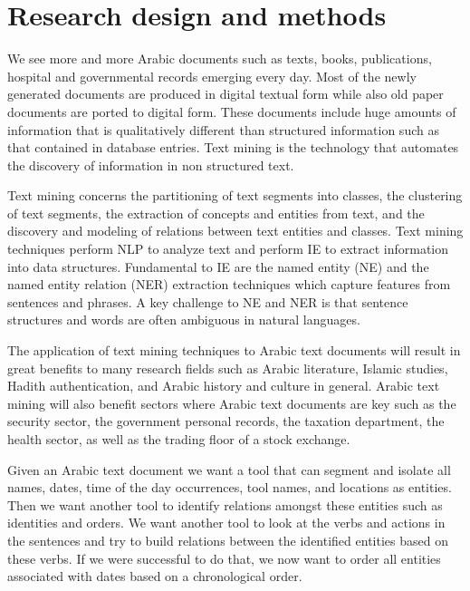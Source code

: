 \documentclass[12pt]{article}
\begin{document}
\section{Research design and methods}
\label{s:designmethods}

We see more and more Arabic documents such as texts,
books, publications, hospital and governmental records emerging 
every day.
Most of the newly generated documents are produced in digital 
textual form while also old paper documents are ported to digital 
form.
These documents include huge amounts of information that is 
qualitatively different than structured information such as that 
contained in database entries.
Text mining is the technology that automates the discovery of 
information in non structured text.

Text mining concerns the partitioning of text segments into classes,
the clustering of text segments,
the extraction of concepts and entities from text,
and the discovery and modeling of relations between text entities 
and classes.
Text mining techniques perform NLP to analyze text and perform 
IE to extract information into data structures.
Fundamental to IE are the named entity (NE) and the named entity 
relation (NER) extraction techniques which capture features from 
sentences and phrases.
A key challenge to NE and NER is that sentence structures and 
words are often ambiguous in natural languages.

The application of text mining techniques to Arabic text documents 
will result in great benefits to many research fields such as 
Arabic literature,
Islamic studies, Hadith authentication, and Arabic history and 
culture in general.
Arabic text mining will also benefit sectors where Arabic text 
documents are key such as the security sector,
the government personal records,
the taxation department,
the health sector,
as well as the trading floor of a stock exchange.
 
Given an Arabic text document we want a tool that can segment 
and isolate all names, dates, time of the day occurrences,
tool names, and locations as entities.
Then we want another tool to identify relations amongst 
these entities such as identities and orders.
We want another tool to look at the verbs and actions in 
the sentences and try to build relations between the identified 
entities based on these verbs.
If we were successful to do that,
we now want to order all entities associated with dates based 
on a chronological order.
\end{document}
